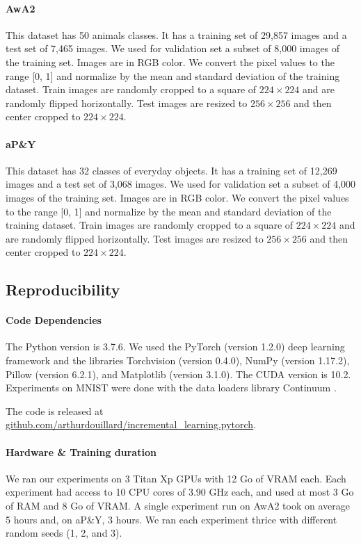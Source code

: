 \paragraph{AwA2} This dataset has 50 animals classes. It has a training set of 29,857 images and a
test set of 7,465 images. We used for validation set a subset of 8,000 images of the training set.
Images are in RGB color. We convert the pixel values to the range [0, 1] and normalize by the mean
and standard deviation of the training dataset. Train images are randomly cropped to a square of
$224\times224$ and are randomly flipped horizontally. Test images are resized to $256\times256$ and
then center cropped to $224\times224$.

\paragraph{aP\&Y} This dataset has 32 classes of everyday objects. It has a training set of 12,269
images and a test set of 3,068 images. We used for validation set a subset of 4,000 images of the
training set. Images are in RGB color. We convert the pixel values to the range [0, 1] and normalize
by the mean and standard deviation of the training dataset. Train images are randomly cropped to a
square of $224\times224$ and are randomly flipped horizontally. Test images are resized to
$256\times256$ and then center cropped to $224\times224$.

\subsection{Reproducibility}

\paragraph{Code Dependencies} The Python version is  3.7.6. We used the PyTorch
\citet{paszke2017pytorch} (version 1.2.0) deep learning framework and the libraries Torchvision
(version 0.4.0), NumPy \citet{oliphant2006numpy} (version 1.17.2), Pillow (version 6.2.1), and
Matplotlib \citet{hunter2007matplotlib} (version 3.1.0). The CUDA version is 10.2. Experiments on
MNIST were done with the data loaders library Continuum \citet{douillardlesort2021continuum}.

The code is released at
\href{https://github.com/arthurdouillard/incremental_learning.pytorch}{github.com/arthurdouillard/incremental\_learning.pytorch}.

\paragraph{Hardware \& Training duration} We ran our experiments on 3 Titan Xp GPUs with 12 Go of
VRAM each. Each experiment had access to 10 CPU cores of 3.90 GHz each, and used at most 3 Go of RAM
and 8 Go of VRAM. A single experiment run on AwA2 took on average 5 hours and, on aP\&Y, 3 hours. We
ran each experiment thrice with different random seeds (1, 2, and 3).


